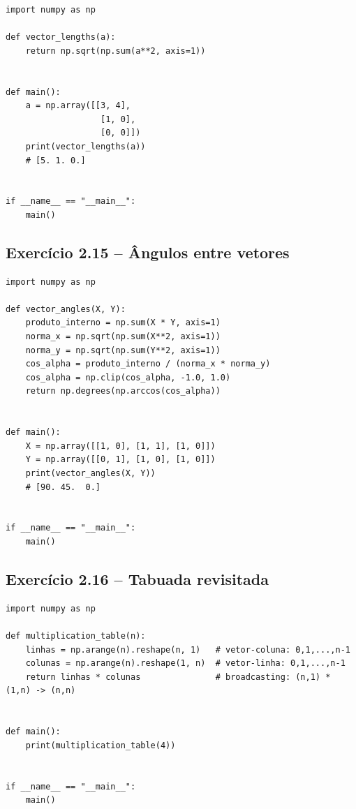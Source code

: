 \documentclass[11pt,a4paper]{article}
\begin{document}
\begin{solucao}
\begin{lstlisting}
import numpy as np

def vector_lengths(a):
    return np.sqrt(np.sum(a**2, axis=1))


def main():
    a = np.array([[3, 4],
                   [1, 0],
                   [0, 0]])
    print(vector_lengths(a))
    # [5. 1. 0.]


if __name__ == "__main__":
    main()
\end{lstlisting}
\end{solucao}

\subsection*{Exercício 2.15 -- Ângulos entre vetores}

\begin{solucao}
\begin{lstlisting}
import numpy as np

def vector_angles(X, Y):
    produto_interno = np.sum(X * Y, axis=1)
    norma_x = np.sqrt(np.sum(X**2, axis=1))
    norma_y = np.sqrt(np.sum(Y**2, axis=1))
    cos_alpha = produto_interno / (norma_x * norma_y)
    cos_alpha = np.clip(cos_alpha, -1.0, 1.0)
    return np.degrees(np.arccos(cos_alpha))


def main():
    X = np.array([[1, 0], [1, 1], [1, 0]])
    Y = np.array([[0, 1], [1, 0], [1, 0]])
    print(vector_angles(X, Y))
    # [90. 45.  0.]


if __name__ == "__main__":
    main()
\end{lstlisting}
\end{solucao}

\subsection*{Exercício 2.16 -- Tabuada revisitada}

\begin{solucao}
\begin{lstlisting}
import numpy as np

def multiplication_table(n):
    linhas = np.arange(n).reshape(n, 1)   # vetor-coluna: 0,1,...,n-1
    colunas = np.arange(n).reshape(1, n)  # vetor-linha: 0,1,...,n-1
    return linhas * colunas               # broadcasting: (n,1) * (1,n) -> (n,n)


def main():
    print(multiplication_table(4))


if __name__ == "__main__":
    main()
\end{lstlisting}
\end{solucao}
\end{document}
